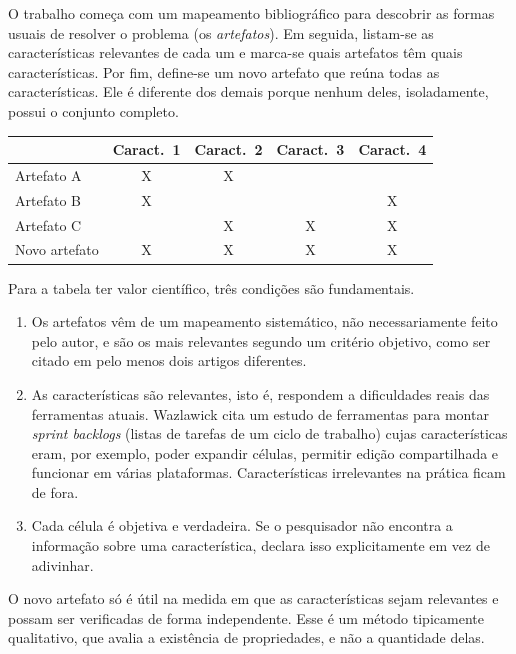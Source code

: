 \documentclass[10pt,a4paper]{extarticle}
\theoremstyle{definition}
\begin{document}
\begin{keybox}
O trabalho começa com um mapeamento bibliográfico para descobrir as formas usuais de resolver o problema (os \emph{artefatos}). Em seguida, listam-se as características relevantes de cada um e marca-se quais artefatos têm quais características. Por fim, define-se um novo artefato que reúna todas as características. Ele é diferente dos demais porque nenhum deles, isoladamente, possui o conjunto completo.

\smallskip
\begin{center}
\small
\begin{tabular}{@{}lcccc@{}}
\toprule
 & Caract.\ 1 & Caract.\ 2 & Caract.\ 3 & Caract.\ 4 \\
\midrule
Artefato A & X & X &  &  \\
Artefato B & X &  &  & X \\
Artefato C &  & X & X & X \\
\midrule
Novo artefato & X & X & X & X \\
\bottomrule
\end{tabular}
\end{center}

\smallskip
Para a tabela ter valor científico, três condições são fundamentais.
\begin{enumerate}[label=\textbf{\arabic*.}]
  \item Os artefatos vêm de um mapeamento sistemático, não necessariamente feito pelo autor, e são os mais relevantes segundo um critério objetivo, como ser citado em pelo menos dois artigos diferentes.
  \item As características são relevantes, isto é, respondem a dificuldades reais das ferramentas atuais. Wazlawick cita um estudo de ferramentas para montar \emph{sprint backlogs} (listas de tarefas de um ciclo de trabalho) cujas características eram, por exemplo, poder expandir células, permitir edição compartilhada e funcionar em várias plataformas. Características irrelevantes na prática ficam de fora.
  \item Cada célula é objetiva e verdadeira. Se o pesquisador não encontra a informação sobre uma característica, declara isso explicitamente em vez de adivinhar.
\end{enumerate}
O novo artefato só é útil na medida em que as características sejam relevantes e possam ser verificadas de forma independente. Esse é um método tipicamente qualitativo, que avalia a existência de propriedades, e não a quantidade delas.
\end{keybox}
\end{document}

